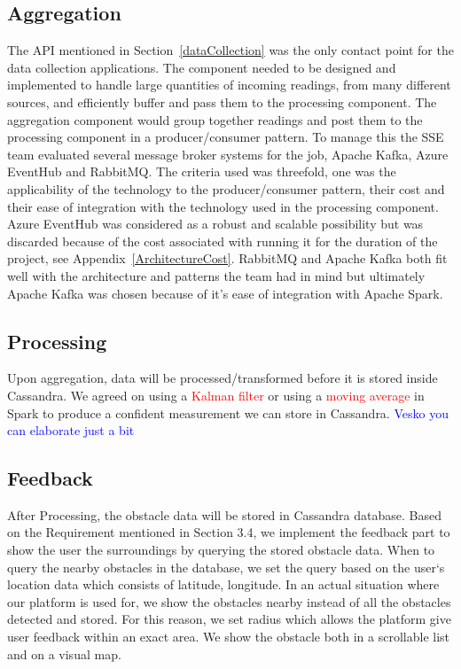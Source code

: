 \documentclass[prodmode,acmtosem]{acmsmall} %
\begin{document}
\subsection{Aggregation}  %
The API mentioned in Section~\ref{dataCollection} was the only contact point for the data collection applications. The component needed to be designed and implemented to handle large quantities of incoming readings, from many different sources, and efficiently buffer and pass them to the processing component. The aggregation component would group together readings and post them to the processing component in a producer/consumer pattern. To manage this the SSE team evaluated several message broker systems for the job, Apache Kafka, Azure EventHub and RabbitMQ. The criteria used was threefold, one was the applicability of the technology to the producer/consumer pattern, their cost and their ease of integration with the technology used in the processing component. Azure EventHub was considered as a robust and scalable possibility but was discarded because of the cost associated with running it for the duration of the project, see Appendix~\ref{ArchitectureCost}. RabbitMQ and Apache Kafka both fit well with the architecture and patterns the team had in mind but ultimately Apache Kafka was chosen because of it's ease of integration with Apache Spark. 

\subsection{Processing}
Upon aggregation, data will be processed/transformed before it is stored inside Cassandra. We agreed on using a \textcolor{red}{Kalman filter} or using a \textcolor{red}{moving average} in Spark to produce a confident measurement we can store in Cassandra. \textcolor{blue}{Vesko you can elaborate just a bit}

\subsection{Feedback}
After Processing, the obstacle data will be stored in Cassandra database. Based on the Requirement mentioned in Section 3.4, we implement the feedback part to show the user the surroundings by querying the stored obstacle data. When to query the nearby obstacles in the database, we set the query based on the user‘s location data which consists of latitude, longitude. In an actual situation where our platform is used for, we show the obstacles nearby instead of all the obstacles detected and stored. For this reason, we set radius which allows the platform give user feedback within an exact area. We show the obstacle both in a scrollable list and on a visual map.
\end{document}
